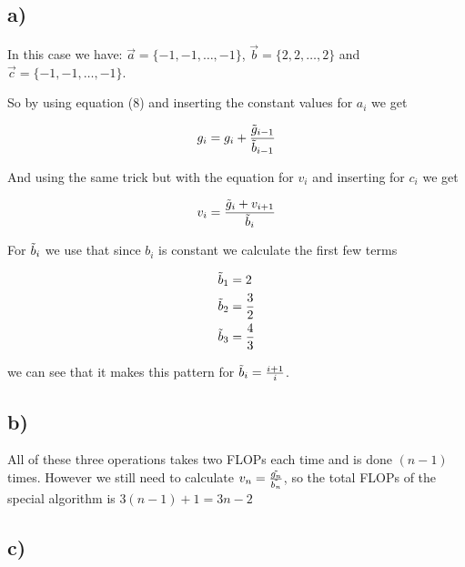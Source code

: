 \documentclass[a4paper,10pt,english]{article}
\begin{document}
			\section{} %
			
			\subsection{a)}
			
			In this case we have: $\vec{a}=\{-1, -1, \dots, -1\}$, $\vec{b}=\{2,2, \dots, 2\}$
			and $\vec{c} = \{-1, -1, \dots, -1\}$.
			
			So by using equation (8) and inserting the constant values for $a_i$ we get
			
			\begin{align*}
				g_i = g_i + \frac{\Tilde{g}_{i - 1}}{\Tilde{b}_{i - 1}}
			\end{align*}
			
			And using the same trick but with the equation for $v_i$ and inserting for $c_i$ we get
			
			\begin{align*}
				v_i = \frac{\Tilde{g}_i + v_{i + 1}}{\Tilde{b}_i}
			\end{align*}
			
			For $\Tilde{b}_i$ we use that since $b_i$ is constant we calculate the first few terms
			
			\begin{align*}
				\Tilde{b}_1 &= 2 \\
				\Tilde{b}_2 &= \frac{3}{2}\\
				\Tilde{b}_3 &= \frac{4}{3}
			\end{align*}
			
			we can see that it makes this pattern for $\Tilde{b}_i = \frac{i + 1}{i}$. \\
			
			\subsection{b)}
			
			All of these three operations takes two FLOPs each time and is done $(n - 1)$ times. However
			we still need to calculate $v_n = \frac{\Tilde{g_n}}{\Tilde{b_n}}$, so the total FLOPs of the special algorithm is 
			$3 (n - 1) + 1 = 3n - 2$
			
			
			\subsection{c)}
			
\end{document}
